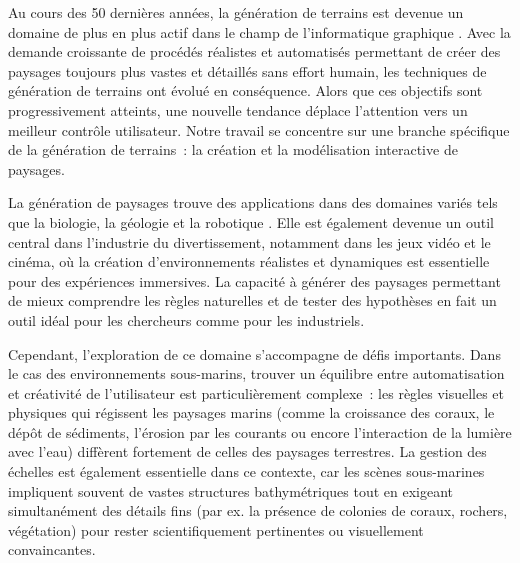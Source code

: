 Au cours des 50 dernières années, la génération de terrains est devenue un domaine de plus en plus actif dans le champ de l'informatique graphique \cite{Fournier1982,Musgrave1989,Miller1986,Galin2019}. Avec la demande croissante de procédés réalistes et automatisés permettant de créer des paysages toujours plus vastes et détaillés sans effort humain, les techniques de génération de terrains ont évolué en conséquence. Alors que ces objectifs sont progressivement atteints, une nouvelle tendance déplace l'attention vers un meilleur contrôle utilisateur. Notre travail se concentre sur une branche spécifique de la génération de terrains~: la création et la modélisation interactive de paysages.

La génération de paysages trouve des applications dans des domaines variés tels que la biologie, la géologie et la robotique \cite{Tzachor2023,Chen2023,Gerigk2025,Rudin2022}. Elle est également devenue un outil central dans l'industrie du divertissement, notamment dans les jeux vidéo et le cinéma, où la création d'environnements réalistes et dynamiques est essentielle pour des expériences immersives. La capacité à générer des paysages permettant de mieux comprendre les règles naturelles et de tester des hypothèses en fait un outil idéal pour les chercheurs comme pour les industriels.

Cependant, l'exploration de ce domaine s'accompagne de défis importants. Dans le cas des environnements sous-marins, trouver un équilibre entre automatisation et créativité de l'utilisateur est particulièrement complexe~: les règles visuelles et physiques qui régissent les paysages marins (comme la croissance des coraux, le dépôt de sédiments, l'érosion par les courants ou encore l'interaction de la lumière avec l'eau) diffèrent fortement de celles des paysages terrestres. La gestion des échelles est également essentielle dans ce contexte, car les scènes sous-marines impliquent souvent de vastes structures bathymétriques tout en exigeant simultanément des détails fins (par ex. la présence de colonies de coraux, rochers, végétation) pour rester scientifiquement pertinentes ou visuellement convaincantes.

